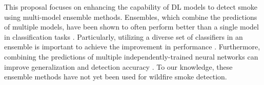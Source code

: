 \documentclass{article}
\begin{document}
This proposal focuses on enhancing the capability of DL models to detect smoke using multi-model ensemble methods. Ensembles, which combine the predictions of multiple models, have been shown to often perform better than a single model in classification tasks \citep{ensemble-ml}. Particularly, utilizing a diverse set of classifiers in an ensemble is important to achieve the improvement in performance \citep{ensemble-diversity}. Furthermore, combining the predictions of multiple independently-trained neural networks can improve generalization and detection accuracy \citep{nn-ensemble,nn-ensemble2, nn-error-ens}. To our knowledge, these ensemble methods have not yet been used for wildfire smoke detection.
\end{document}
